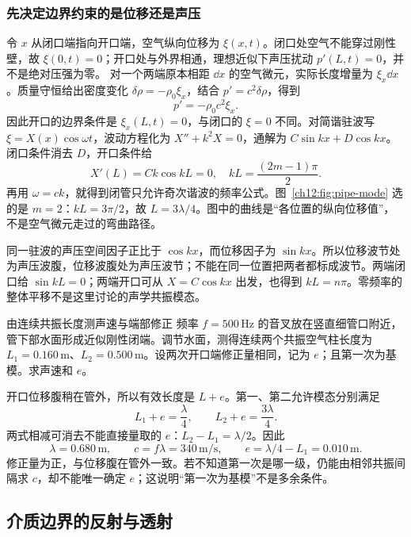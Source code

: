 \subsubsection{先决定边界约束的是位移还是声压}
令 $x$ 从闭口端指向开口端，空气纵向位移为 $\xi(x,t)$。闭口处空气不能穿过刚性壁，故 $\xi(0,t)=0$；开口处与外界相通，理想近似下声压扰动 $p'(L,t)=0$，并不是绝对压强为零。
对一个两端原本相距 $\dd x$ 的空气微元，实际长度增量为 $\xi_x\dd x$。质量守恒给出密度变化 $\delta\rho=-\rho_0\xi_x$，结合 $p'=c^2\delta\rho$，得到
\[
 p'=-\rho_0c^2\xi_x.
\]
因此开口的边界条件是 $\xi_x(L,t)=0$，与闭口的 $\xi=0$ 不同。对简谐驻波写 $\xi=X(x)\cos\omega t$，波动方程化为 $X''+k^2X=0$，通解为 $C\sin kx+D\cos kx$。闭口条件消去 $D$，开口条件给
\[
 X'(L)=Ck\cos kL=0,
 \quad kL=\frac{(2m-1)\pi}{2}.
\]
再用 $\omega=ck$，就得到闭管只允许奇次谐波的频率公式。图~\ref{ch12:fig:pipe-mode} 选的是 $m=2$：$kL=3\pi/2$，故 $L=3\lambda/4$。图中的曲线是“各位置的纵向位移值”，不是空气微元走过的弯曲路径。

同一驻波的声压空间因子正比于 $\cos kx$，而位移因子为 $\sin kx$。所以位移波节处为声压波腹，位移波腹处为声压波节；不能在同一位置把两者都标成波节。两端闭口给 $\sin kL=0$；两端开口可从 $X=C\cos kx$ 出发，也得到 $kL=n\pi$。零频率的整体平移不是这里讨论的声学共振模态。

\begin{origexamplebox}{由连续共振长度测声速与端部修正}\label{ch12:ex:teaching-resonance-length}
频率 $f=500\,\mathrm{Hz}$ 的音叉放在竖直细管口附近，管下部水面形成近似刚性闭端。调节水面，测得连续两个共振空气柱长度为 $L_1=0.160\,\mathrm m$、$L_2=0.500\,\mathrm m$。设两次开口端修正量相同，记为 $e$；且第一次为基模。求声速和 $e$。

\ThQResonanceLength
\end{origexamplebox}
\begin{xesolution}
\ThAResonanceLength

开口位移腹稍在管外，所以有效长度是 $L+e$。第一、第二允许模态分别满足
\[
 L_1+e=\frac\lambda4,\qquad L_2+e=\frac{3\lambda}4.
\]
两式相减可消去不能直接量取的 $e$：$L_2-L_1=\lambda/2$。因此
\[
 \lambda=0.680\,\mathrm m,\qquad
 c=f\lambda=340\,\mathrm{m/s},\qquad
 e=\lambda/4-L_1=0.010\,\mathrm m.
\]
修正量为正，与位移腹在管外一致。若不知道第一次是哪一级，仍能由相邻共振间隔求 $c$，却不能唯一确定 $e$；这说明“第一次为基模”不是多余条件。
\end{xesolution}

\subsection{介质边界的反射与透射}

